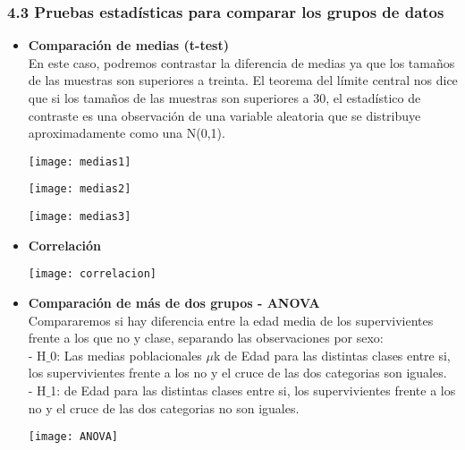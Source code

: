 \documentclass[12pt]{article}
\providecommand{\tightlist}{%
  \setlength{\itemsep}{0pt}\setlength{\parskip}{0pt}}
\begin{document}
\hypertarget{estadistica}{%
\subsubsection{4.3  Pruebas estadísticas para comparar los grupos de datos}\label{estadistica}}
\begin{itemize}
\tightlist
\item
  \textbf{Comparación de medias (t-test)}\\
  En este caso, podremos contrastar la diferencia de medias ya que los tamaños de las muestras son superiores a treinta. El teorema del límite central nos dice que si los tamaños de las muestras son superiores a 30, el estadístico de contraste es una observación de una variable aleatoria que se distribuye aproximadamente como una N(0,1).
  \label{imagen}
  	\begin{center}
  	\texttt{[image: medias1]}
\end{center}
\label{imagen}
  	\begin{center}
  	\texttt{[image: medias2]}
\end{center}
\label{imagen}
  	\begin{center}
  	\texttt{[image: medias3]}
\end{center}
\item
  \textbf{Correlación}\\
  \label{imagen}
  	\begin{center}
  	\texttt{[image: correlacion]}
\end{center} 
\item
  \textbf{Comparación de más de dos grupos - ANOVA}\\
Compararemos si hay diferencia entre la edad media de los supervivientes frente a los que no y clase, separando las observaciones por sexo:\\

- H$\_$0: Las medias poblacionales $\mu$k de Edad para las distintas clases entre si, los supervivientes frente a los no y el cruce de las dos categorias son iguales.\\
- H$\_$1: de Edad para las distintas clases entre si, los supervivientes frente a los no y el cruce de las dos categorias no son iguales.\\
\label{imagen}
  	\begin{center}
  	\texttt{[image: ANOVA]}
\end{center}


\end{itemize}
\end{document}
